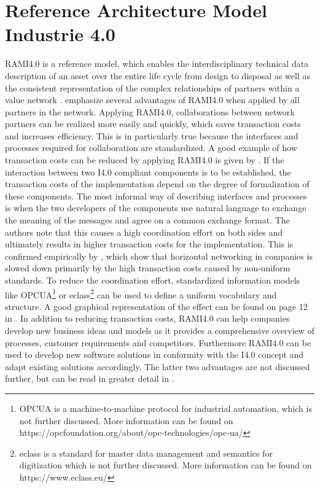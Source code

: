 \section{Reference Architecture Model Industrie 4.0} \label{sec:rami40}
\ac{RAMI4.0} is a reference model, which enables the interdisciplinary technical data description of an asset over the entire life cycle from design to disposal as well as the consistent representation of the complex relationships of partners within a value network \cite[p. 4]{Heidel2017ReferenzarchitekturmodellIndustrie4.0Komponente}. \citet[p. 23]{Arnold2018DigitaleMittelstand} emphasize several advantages of \ac{RAMI4.0} when applied by all partners in the network. Applying \ac{RAMI4.0}, collaborations between network partners can be realized more easily and quickly, which saves transaction costs and increases efficiency. This is in particularly true because the interfaces and processes required for collaboration are standardized. A good example of how transaction costs can be reduced by applying \ac{RAMI4.0} is given by \citet[p. 11]{Bayha2020DescribingComponents}. If the interaction between two \ac{I4.0} compliant components is to be established, the transaction costs of the implementation depend on the degree of formalization of these components. The most informal way of describing interfaces and processes is when the two developers of the components use natural language to exchange the meaning of the messages and agree on a common exchange format. The authors note that this causes a high coordination effort on both sides and ultimately results in higher transaction costs for the implementation. This is confirmed empirically by \citet[p. 14]{Arnold2018DigitaleMittelstand}, which show that horizontal networking in companies is slowed down primarily by the high transaction costs caused by non-uniform standards. To reduce the coordination effort, standardized information models like \ac{OPCUA}\footnote{\ac{OPCUA} is a machine-to-machine protocol for industrial automation, which is not further discussed. More information can be found on https://opcfoundation.org/about/opc-technologies/opc-ua/} or eclass\footnote{eclass is a standard for master data management and semantics for digitization which is not further discussed. More information can be found on https://www.eclass.eu/} can be used to define a uniform vocabulary and structure. A good graphical representation of the effect can be found on page 12 in \citet{Bayha2020DescribingComponents}. In addition to reducing transaction costs, \ac{RAMI4.0} can help companies develop new business ideas and models as it provides a comprehensive overview of processes, customer requirements and competitors. Furthermore \ac{RAMI4.0} can be used to develop new software solutions in conformity with the \ac{I4.0} concept and adapt existing solutions accordingly. The latter two advantages are not discussed further, but can be read in greater detail in \citet[p. 24 ff]{Arnold2018DigitaleMittelstand}.

